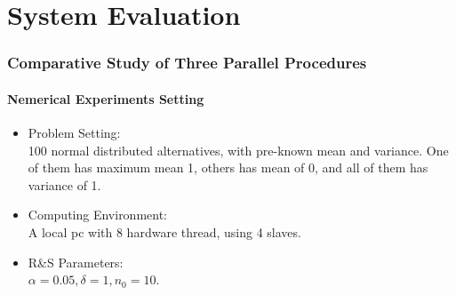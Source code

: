 \documentclass{beamer}
\begin{document}

\section{System Evaluation}

\begin{frame}
\frametitle{Comparative Study of Three Parallel Procedures}
\framesubtitle{Nemerical Experiments Setting}
\begin{itemize}
\item {Problem Setting: } \\ 100 normal distributed alternatives, with pre-known mean and variance. One of them has maximum mean 1, others has mean of 0, and all of them has variance of 1.
\vspace{\baselineskip}
\item {Computing Environment: } \\ A local pc with 8 hardware thread, using 4 slaves.
\vspace{\baselineskip}
\item {R\&S Parameters: } \\ $\alpha=0.05, \delta=1, n_0 = 10$.
\end{itemize}
\end{frame}
\end{document}
